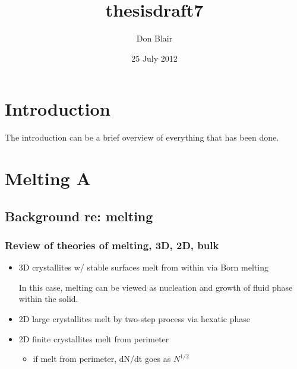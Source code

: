 \documentclass[11pt]{article}
\title{thesisdraft7}
\author{Don Blair}
\date{25 July 2012}
\begin{document}
\maketitle

\setcounter{tocdepth}{3}
\tableofcontents
\vspace*{1cm}

\section{Introduction}
\label{sec-1}


The introduction can be a brief overview of everything that has been done.

\section{Melting A}
\label{sec-2}

\subsection{Background re: melting}
\label{sec-2.1}

\subsubsection{Review of theories of melting, 3D, 2D, bulk}
\label{sec-2.1.1}

\begin{itemize}

\item 3D crystallites w/ stable surfaces melt from within via Born melting\\
\label{sec-2.1.1.1}

In this case, melting can be viewed as nucleation and growth of fluid phase within the solid.

\item 2D large crystallites melt by two-step process via hexatic phase\\
\label{sec-2.1.1.2}


\item 2D finite crystallites melt from perimeter\\
\label{sec-2.1.1.3}

\begin{itemize}

\item if melt from perimeter, dN/dt goes as $N^{1/2}$\\
\label{sec-2.1.1.3.1}

\end{itemize} %
\end{itemize} %
\end{document}
